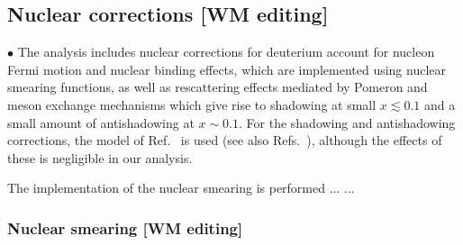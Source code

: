 \documentclass[aps,prd,amsmath,preprint]{revtex4}
\begin{document}
\subsection{Nuclear corrections {\color{red} [WM editing]}}
\label{ssec:nuclear}

$\bullet$
The analysis includes nuclear corrections for deuterium account for
nucleon Fermi motion and nuclear binding effects, which are implemented
using nuclear smearing functions, as well as rescattering effects
mediated by Pomeron and meson exchange mechanisms which give rise to
shadowing at small $x \lesssim 0.1$ and a small amount of antishadowing
at $x \sim 0.1$.
For the shadowing and antishadowing corrections, the model of
Ref.~\cite{MTshad} is used (see also Refs.~\cite{Badelek92, Kaptari91}),
although the effects of these is negligible in our analysis.


The implementation of the nuclear smearing is performed ... ...



\subsubsection{Nuclear smearing {\color{red} [WM editing]}}
\label{sssec:smear}
\end{document}
